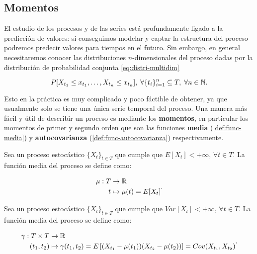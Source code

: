 \subsection{Momentos}

El estudio de los procesos y de las series está profundamente ligado a la predicción de valores: si conseguimos modelar y captar la estructura del proceso podremos predecir valores para tiempos en el futuro. Sin embargo, en general necesitaremos conocer las distribuciones $n$-dimensionales del proceso dadas por la distribución de probabilidad conjunta \eqref{eq:distri-multidim}

\begin{equation}
  P[X_{t_1} \leq x_{t_1}, \ldots, X_{t_n} \leq x_{t_n}], \; \forall \{t_i\}^n_{i = 1} \subseteq T, \; \forall n \in \mathbb{N}.
  \label{eq:distri-multidim}
\end{equation}

Esto en la práctica es muy complicado y poco fáctible de obtener, ya que usualmente solo se tiene una única serie temporal del proceso. Una manera más fácil y útil de describir un proceso es mediante los \textbf{momentos}, en particular los momentos de primer y segundo orden que son las funciones \textbf{media} (\autoref{def:func-media}) y \textbf{autocovarianza} (\autoref{def:func-autocovarianza}) respectivamente.

\begin{definicion}
  Sea un proceso estocástico $\{X_t\}_{t \in T}$ que cumple que $E[X_t] < +\infty, \, \forall t \in T$. La función media del proceso se define como:

  $$\begin{aligned} \mu : T & \to \mathbb{R} \\
    t & \mapsto \mu(t) = E[X_t]
  \end{aligned}.$$
  \label{def:func-media}
\end{definicion}

\begin{definicion}
  Sea un proceso estocástico $\{X_t\}_{t \in T}$ que cumple que $Var[X_t] < +\infty, \, \forall t \in T$. La función media del proceso se define como:

  $$\begin{aligned} \gamma : T \times T & \to \mathbb{R} \\
    (t_1, t_2) & \mapsto \gamma(t_1, t_2) = E\left[(X_{t_1} - \mu(t_1))(X_{t_2} - \mu(t_2))\right] = Cov(X_{t_1}, X_{t_2})
  \end{aligned}.$$
  \label{def:func-autocovarianza}
\end{definicion}

